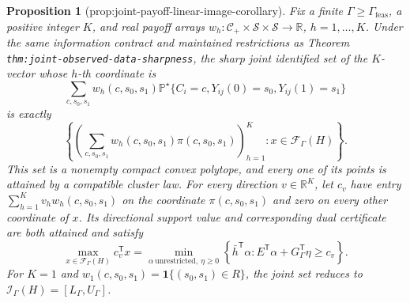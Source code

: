 \documentclass{article}
\newtheorem{proposition}{Proposition}
\begin{document}
\begin{proposition}[prop:joint-payoff-linear-image-corollary]\label{prop:joint-payoff-linear-image-corollary}
Fix a finite \(\Gamma\geq\Gamma_{\mathrm{feas}}\), a positive integer \(K\), and real payoff arrays \(w_h:\mathcal C_+\times\mathcal S\times\mathcal S\to\mathbb R\), \(h=1,\ldots,K\).  Under the same information contract and maintained restrictions as Theorem \texttt{thm:joint-observed-data-sharpness}, the sharp joint identified set of the \(K\)-vector whose \(h\)-th coordinate is
\[
\sum_{c,s_0,s_1}w_h(c,s_0,s_1)
\mathbb P^{\star}\{C_i=c,Y_{ij}(0)=s_0,Y_{ij}(1)=s_1\}
\]
is exactly
\[
\left\{
\left(\sum_{c,s_0,s_1}w_h(c,s_0,s_1)\pi(c,s_0,s_1)\right)_{h=1}^{K}
:x\in\mathcal F_{\Gamma}(H)
\right\}.
\]
This set is a nonempty compact convex polytope, and every one of its points is attained by a compatible cluster law.  For every direction \(v\in\mathbb R^K\), let \(c_v\) have entry \(\sum_{h=1}^K v_h w_h(c,s_0,s_1)\) on the coordinate \(\pi(c,s_0,s_1)\) and zero on every other coordinate of \(x\).  Its directional support value and corresponding dual certificate are both attained and satisfy
\[
\max_{x\in\mathcal F_{\Gamma}(H)}c_v^{\mathsf T}x
=\min_{\alpha\ \mathrm{unrestricted},\ \eta\geq0}
\left\{\bar h^{\mathsf T}\alpha:
E^{\mathsf T}\alpha+G_{\Gamma}^{\mathsf T}\eta\geq c_v\right\}.
\]
For \(K=1\) and \(w_1(c,s_0,s_1)=\mathbf 1\{(s_0,s_1)\in R\}\), the joint set reduces to \(\mathcal I_{\Gamma}(H)=[L_{\Gamma},U_{\Gamma}]\).
\end{proposition}
\end{document}
